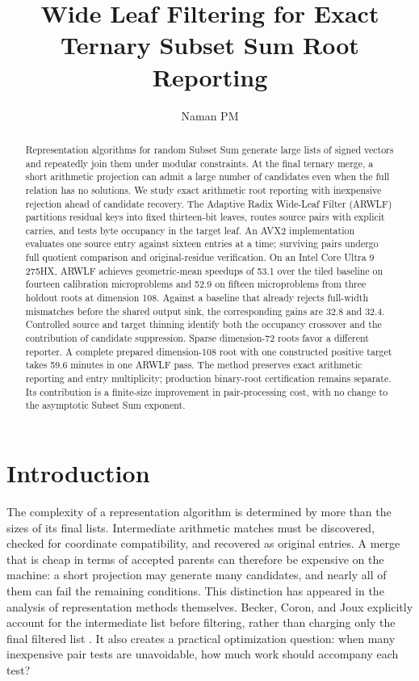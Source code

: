 \documentclass[manuscript,screen,review]{acmart}
\title{Wide Leaf Filtering for Exact Ternary Subset Sum Root Reporting}
\author{Naman PM}
\begin{document}
\begin{abstract}
Representation algorithms for random Subset Sum generate large lists of signed vectors and repeatedly join them under modular constraints. At the final ternary merge, a short arithmetic projection can admit a large number of candidates even when the full relation has no solutions. We study exact arithmetic root reporting with inexpensive rejection ahead of candidate recovery. The Adaptive Radix Wide-Leaf Filter (ARWLF) partitions residual keys into fixed thirteen-bit leaves, routes source pairs with explicit carries, and tests byte occupancy in the target leaf. An AVX2 implementation evaluates one source entry against sixteen entries at a time; surviving pairs undergo full quotient comparison and original-residue verification. On an Intel Core Ultra 9 275HX, ARWLF achieves geometric-mean speedups of 53.1 over the tiled baseline on fourteen calibration microproblems and 52.9 on fifteen microproblems from three holdout roots at dimension 108. Against a baseline that already rejects full-width mismatches before the shared output sink, the corresponding gains are 32.8 and 32.4. Controlled source and target thinning identify both the occupancy crossover and the contribution of candidate suppression. Sparse dimension-72 roots favor a different reporter. A complete prepared dimension-108 root with one constructed positive target takes 59.6 minutes in one ARWLF pass. The method preserves exact arithmetic reporting and entry multiplicity; production binary-root certification remains separate. Its contribution is a finite-size improvement in pair-processing cost, with no change to the asymptotic Subset Sum exponent.
\end{abstract}
\maketitle
\raggedbottom
\section{Introduction}
The complexity of a representation algorithm is determined by more than the sizes of its final lists. Intermediate arithmetic matches must be discovered, checked for coordinate compatibility, and recovered as original entries. A merge that is cheap in terms of accepted parents can therefore be expensive on the machine: a short projection may generate many candidates, and nearly all of them can fail the remaining conditions. This distinction has appeared in the analysis of representation methods themselves. Becker, Coron, and Joux explicitly account for the intermediate list before filtering, rather than charging only the final filtered list \cite{bcj2011}. It also creates a practical optimization question: when many inexpensive pair tests are unavoidable, how much work should accompany each test?
\end{document}
